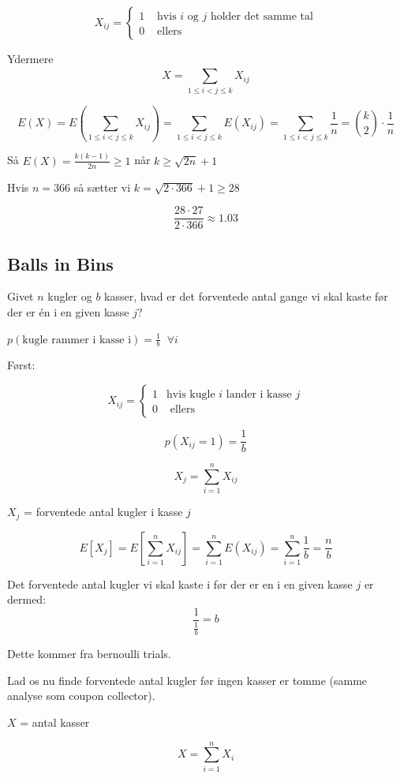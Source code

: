\documentclass[11pt]{article}
\theoremstyle{definition}
\theoremstyle{remark}
\begin{document}
\[
X_{ij} = \begin{cases}
  1 & \text{ hvis } i \text{ og } j \text{ holder det samme tal}\\
  0 & \text{ ellers}
\end{cases}
\]

Ydermere
\[
  X = \sum_{1 \leq i < j \leq k}^{}X_{ij}
\]

\[
E(X) = E(\sum_{1 \leq i < j \leq k}^{}X_{ij}) = \sum_{1 \leq i < j \leq k}^{} E(X_{ij}) = \sum_{1 \leq i < j \leq k}^{} \frac{1}{n} = \binom{k}{2} \cdot \frac{1}{n}
\]

Så $E(X) = \frac{k(k-1)}{2n} \geq 1$ når $k \geq \sqrt{2n}+1$

Hvis $n = 366$  så sætter vi $k = \sqrt{2 \cdot 366}+1 \geq 28$

\[
\frac{28 \cdot 27}{2 \cdot 366} \approx 1.03
\]

\subsection{Balls in Bins}
\label{subsec:label}

Givet $n$ kugler og $b$ kasser, hvad er det forventede antal gange vi skal kaste før der er én i en given kasse $j$?

$p(\text{kugle rammer i kasse i}) = \frac{1}{b}\;\; \forall i$

Først:

\[
X_{ij} = \begin{cases}
  1 & \text{hvis kugle } i \text{ lander i kasse } j\\
  0 & \text{ ellers}
\end{cases}
\]

\[
p(X_{ij}=1) = \frac{1}{b}
\]

\[
X_{j} = \sum_{i=1}^{n} X_{ij}
\]

$X_{j}$ = forventede antal kugler i kasse $j$


\[
E[X_{j}] = E[\sum_{i=1}^{n}X_{ij}] = \sum_{i=1}^{n} E(X_{ij}) = \sum_{i=1}^{n} \frac{1}{b} = \frac{n}{b}
\]


Det forventede antal kugler vi skal kaste i før der er en i en given kasse $j$ er dermed:
\[
\frac{1}{\frac{1}{b}} = b
\]

Dette kommer fra bernoulli trials.

Lad os nu finde forventede antal kugler før ingen kasser er tomme (samme analyse som coupon collector).

$X$ = antal kasser

\[
X = \sum_{i=1}^{n}X_{i}
\]
\end{document}
